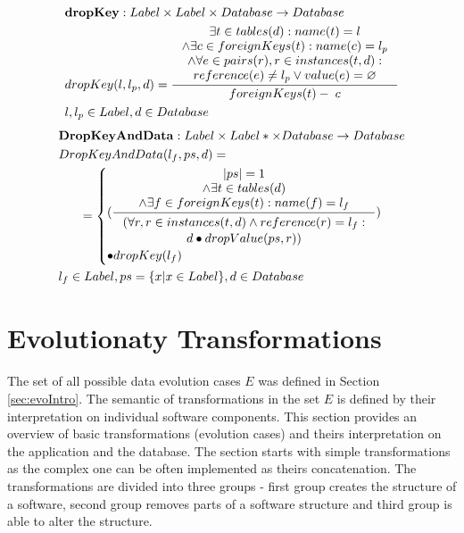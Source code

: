 \documentclass[11pt]{article}
\begin{document}
\begin{align*}
&	\mathbf{dropKey} : Label \times Label \times Database \rightarrow Database \\
&	dropKey(l, l_p, d) = \inference{ \exists t \in tables(d) : name(t) = l \\ \wedge \exists c \in foreignKeys(t) : name(c) = l_p \\ \wedge \forall e \in  pairs(r), r \in instances(t, d) : \\ reference(e) \neq l_p \vee value(e) = \varnothing  }{foreignKeys(t) - \; c}\\
&	 l, l_p \in Label, d \in Database 
\end{align*}
\begin{align*}
&	\mathbf{DropKeyAndData} : Label \times Label* \times Database \rightarrow Database \\
&	DropKeyAndData(l_f, ps, d) = \\
& \;\;\;\;\;\; = \begin{cases}
 	(\inference{|ps| = 1 \\ \wedge \exists t \in tables(d) \\ \wedge \exists f \in foreignKeys(t) : name(f) = l_f}{\begin{gathered}
	 	(\forall r, r \in instances(t,d) \wedge reference(r) = l_f: \\d \bullet dropValue(ps, r)) \end{gathered}}) \\ \bullet dropKey(l_f)  
 \end{cases}
	\\
&	l_f \in Label, ps = \{x | x \in Label \}, d \in Database
\end{align*}



\section{Evolutionaty Transformations}
\label{sec:Evolutionaty-Transformations}
The set of all possible data evolution cases $E$ was defined in Section \ref{sec:evoIntro}. The semantic of transformations in the set $E$ is defined by their interpretation on individual software components. This section provides an overview of basic transformations (evolution cases) and theirs interpretation on the application and the database. The section starts with simple transformations as the complex one can be often implemented as theirs concatenation. The transformations are divided into three groups - first group creates the structure of a software, second group removes parts of a software structure and third group is able to alter the structure.
\end{document}
